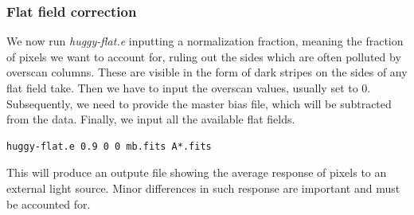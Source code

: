 \documentclass[a4paper,11pt,twocolumn]{article}
\begin{document}
\subsubsection{Flat field correction}
We now run \textit{huggy-flat.e} inputting a normalization fraction, 
meaning the fraction of pixels we want to account for, ruling out the 
sides which are often polluted by overscan columns. These are visible 
in the form of dark stripes on the sides of any flat field take. Then 
we have to input the overscan values, usually set to 0. Subsequently,
we need to provide the master bias file, which will be subtracted from 
the data. Finally, we input all the available flat fields.
\begin{lstlisting}
huggy-flat.e 0.9 0 0 mb.fits A*.fits
\end{lstlisting}
This will produce an outpute file showing the average response of
pixels to an external light source. Minor differences in such response 
are important and must be accounted for.
\end{document}
